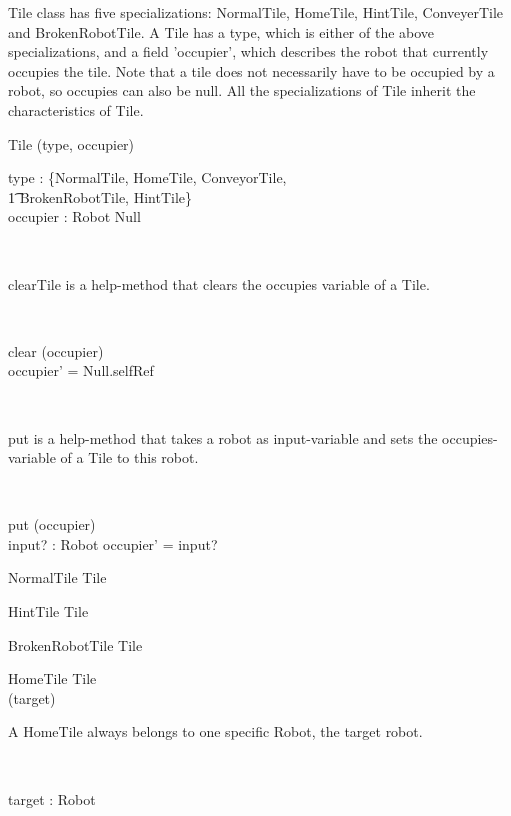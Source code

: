 Tile class has five specializations: NormalTile, HomeTile, HintTile, ConveyerTile and BrokenRobotTile. A Tile has a type, which is either of the above specializations, and a field 'occupier', which describes the robot that currently occupies the tile. Note that a tile does not necessarily have to be occupied by a robot, so occupies can also be null. All the specializations of Tile inherit the characteristics of Tile.
\begin{class}{Tile}
\upharpoonright (type, occupier) \\
\begin{state}
type : \{NormalTile, HomeTile, ConveyorTile, \\ \t1 BrokenRobotTile, HintTile\} \\
occupier : Robot \cup Null
\end{state} \\
\begin{classcom}
clearTile is a help-method that clears the occupies variable of a Tile.
\end{classcom} \\
\begin{schema}{clear}
\Delta (occupier) \\
\where
occupier' = Null.selfRef
\end{schema} \\
\begin{classcom}
put is a help-method that takes a robot as input-variable and sets the occupies-variable of a Tile to this robot.
\end{classcom}\\
\begin{schema}{put}
\Delta (occupier) \\
input? : Robot
\where
occupier' = input?
\end{schema}
\end{class}

\begin{class}{NormalTile}
Tile
\end{class}

\begin{class}{HintTile}
Tile
\end{class}

\begin{class}{BrokenRobotTile}
Tile
\end{class}

\begin{class}{HomeTile}
Tile \\
\upharpoonright (target) \\
\begin{classcom}
A HomeTile always belongs to one specific Robot, the target robot.
\end{classcom} \\
\begin{state}
target : Robot
\end{state}
\end{class}

